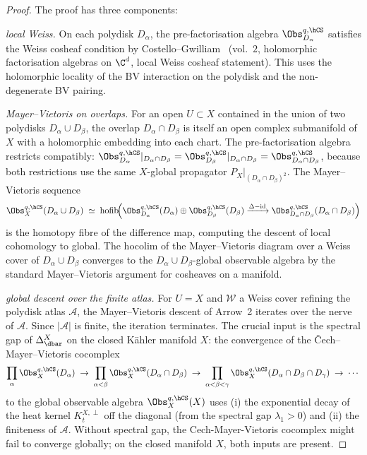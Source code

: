 \begin{proof}
 The proof has three components:

\emph{local Weiss.} On each polydisk $D_\alpha$, the
pre-factorisation algebra $\Obs^{q,\hCS}_{D_\alpha}$ satisfies the
Weiss cosheaf condition by Costello--Gwilliam~\cite{CostelloGwilliam}
\textup{(}vol.~$2$, holomorphic factorisation algebras on $\C^d$, local
Weiss cosheaf statement\textup{).} This uses the holomorphic locality
of the BV interaction on the polydisk and the non-degenerate BV pairing.

\emph{Mayer--Vietoris on overlaps.}
For an open $U \subset X$ contained in the union of two polydisks
$D_\alpha \cup D_\beta$, the overlap $D_\alpha \cap D_\beta$ is itself
an open complex submanifold of $X$ with a holomorphic embedding into
each chart. The pre-factorisation algebra restricts compatibly:
$\Obs^{q,\hCS}_{D_\alpha}|_{D_\alpha \cap D_\beta}
 = \Obs^{q,\hCS}_{D_\beta}|_{D_\alpha \cap D_\beta}
 = \Obs^{q,\hCS}_{D_\alpha \cap D_\beta}$,
because both restrictions use the same $X$-global propagator
$P_X|_{(D_\alpha \cap D_\beta)^2}$. The Mayer--Vietoris sequence
\begin{equation}
\label{eq:mayer-vietoris-pre-fa}
 \Obs^{q,\hCS}_X(D_\alpha \cup D_\beta)
 \;\simeq\;
 \mathrm{hofib}\!\Bigl( \Obs^{q,\hCS}_{D_\alpha}(D_\alpha) \oplus \Obs^{q,\hCS}_{D_\beta}(D_\beta) \xrightarrow{\Delta - \mathrm{id}} \Obs^{q,\hCS}_{D_\alpha \cap D_\beta}(D_\alpha \cap D_\beta) \Bigr)
\end{equation}
is the homotopy fibre of the difference map, computing the descent of
local cohomology to global. The hocolim of the Mayer--Vietoris diagram
over a Weiss cover of $D_\alpha \cup D_\beta$ converges to the
$D_\alpha \cup D_\beta$-global observable algebra by the standard
Mayer--Vietoris argument for cosheaves on a manifold.

\emph{global descent over the finite atlas.}
For $U = X$ and $\mathcal{W}$ a Weiss cover refining the polydisk atlas
$\mathcal{A}$, the Mayer--Vietoris descent of Arrow~2 iterates over the
nerve of $\mathcal{A}$. Since $|\mathcal{A}|$ is finite, the iteration
terminates. The crucial input is the spectral gap of $\Delta_{\dbar}^X$
on the closed K\"ahler manifold $X$: the convergence of the
\v{C}ech--Mayer--Vietoris cocomplex
\[
 \prod_\alpha \Obs^{q,\hCS}_X(D_\alpha) \;\to\; \prod_{\alpha < \beta} \Obs^{q,\hCS}_X(D_\alpha \cap D_\beta) \;\to\; \prod_{\alpha < \beta < \gamma} \Obs^{q,\hCS}_X(D_\alpha \cap D_\beta \cap D_\gamma) \;\to\; \cdots
\]
to the global observable algebra $\Obs^{q,\hCS}_X(X)$ uses (i) the
exponential decay of the heat kernel $K_t^{X, \perp}$ off the diagonal
\textup{(}from the spectral gap $\lambda_1 > 0$\textup{)} and (ii) the
finiteness of $\mathcal{A}$. Without spectral gap, the Cech-Mayer-Vietoris
cocomplex might fail to converge globally; on the closed manifold $X$,
both inputs are present.


\end{proof}
